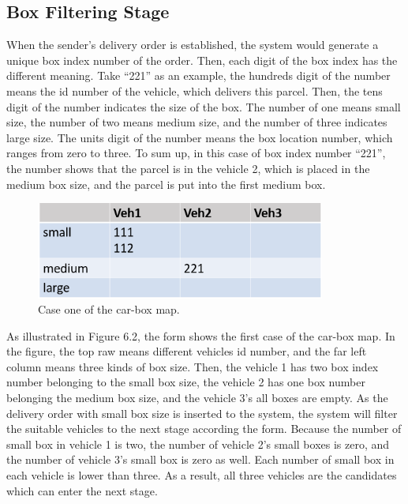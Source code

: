 \documentclass[12pt]{ksthesis}
\begin{document}
\begin{thesis}
{\section{Box Filtering Stage }
When the sender’s delivery order is established, the system would generate a unique box index number of the order. Then, each digit of the box index has the different meaning. Take “221” as an example, the hundreds digit of the number means the id number of the vehicle, which delivers this parcel. Then, the tens digit of the number indicates the size of the box. The number of one means small size, the number of two means medium size, and the number of three indicates large size. The units digit of the number means the box location number, which ranges from zero to three. 
To sum up, in this case of box index number “221”, the number shows that the parcel is in the vehicle 2, which is placed in the medium box size, and the parcel is put into the first medium box.

\begin{figure}[H]
\centering
\includegraphics[width=0.85\textwidth]{./Thesis_figures/F6-2_caseOne_boxFiltering.PNG}
\caption{\large Case one of the car-box map.}
\vspace{0.5cm}
\label{Fig:CaseOne_carBox_Map}
\end{figure}

As illustrated in Figure 6.2, the form shows the first case of the car-box map. In the figure, the top raw means different vehicles id number, and the far left column means three kinds of box size. Then, the vehicle 1 has two box index number belonging to the small box size, the vehicle 2 has one box number belonging the medium box size, and the vehicle 3’s all boxes are empty.
As the delivery order with small box size is inserted to the system, the system will filter the suitable vehicles to the next stage according the form. Because the number of small box in vehicle 1 is two, the number of vehicle 2’s small boxes is zero, and the number of vehicle 3’s small box is zero as well. Each number of small box in each vehicle is lower than three. As a result, all three vehicles are the candidates which can enter the next stage.

}
\end{thesis}
\end{document}
